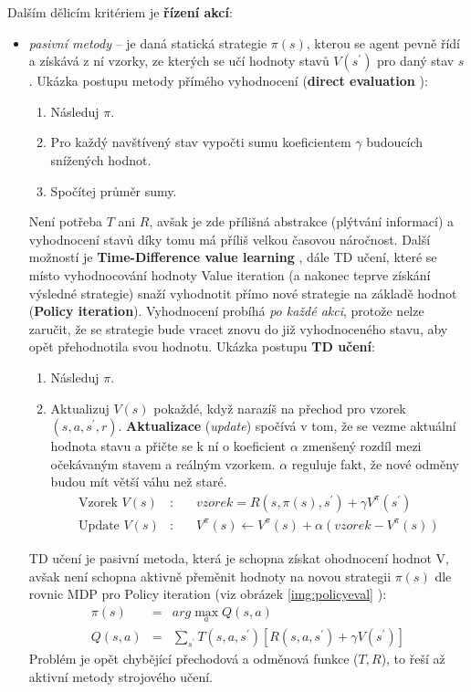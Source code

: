 Dalším dělicím kritériem je \textbf{řízení akcí}:
\begin{itemize}
  \item \textit{pasivní metody} -- je daná statická strategie $\pi(s)$, kterou se agent pevně řídí a získává z ní vzorky, ze kterých se učí hodnoty stavů $V(s^\prime)$ pro daný stav $s$.
  \newline
  Ukázka postupu metody přímého vyhodnocení (\textbf{direct evaluation} \cite{berkeley}):
  \begin{enumerate}
    \item Následuj $\pi$.
    \item Pro každý navštívený stav vypočti sumu koeficientem $\gamma$ budoucích snížených hodnot.
    \item Spočítej průměr sumy.
  \end{enumerate}
  Není potřeba $T$ ani $R$, avšak je zde přílišná abstrakce (plýtvání informací) a vyhodnocení stavů díky tomu má příliš velkou časovou náročnost.
  \newline
  Další možností je \textbf{Time-Difference value learning} \cite{RLIntro}, dále TD učení, které se místo vyhodnocování hodnoty Value iteration (a nakonec teprve získání výsledné strategie) snaží vyhodnotit přímo nové strategie na základě hodnot (\textbf{Policy iteration}). Vyhodnocení probíhá \textit{po každé akci}, protože nelze zaručit, že se strategie bude vracet znovu do již vyhodnoceného stavu, aby opět přehodnotila svou hodnotu.
  \newline
  Ukázka postupu \textbf{TD učení}:
  \begin{enumerate}
    \item Následuj $\pi$.
    \item Aktualizuj $V(s)$ pokaždé, když narazíš na přechod pro vzorek $(s,a,s^\prime,r)$. \textbf{Aktualizace} (\textit{update}) spočívá v tom, že se vezme aktuální hodnota stavu a přičte se k ní o koeficient $\alpha$ zmenšený rozdíl mezi očekávaným stavem a reálným vzorkem. $\alpha$ reguluje fakt, že nové odměny budou mít větší váhu než staré.
    \begin{eqnarray}
    \textrm{Vzorek $V(s)$} &\textrm{:}& \quad vzorek = R(s,\pi(s),s^\prime)+\gamma V^\pi(s^\prime) \\
    \textrm{Update $V(s)$} &\textrm{:}& \quad V^\pi(s) \leftarrow  V^\pi(s) + \alpha(vzorek - V^\pi(s))
    \end{eqnarray}
  \end{enumerate}
  TD učení je pasivní metoda, která je schopna získat ohodnocení hodnot V, avšak není schopna aktivně přeměnit hodnoty na novou strategii $\pi(s)$ dle rovnic MDP pro Policy iteration (viz obrázek \ref{img:policyeval} \cite{berkeley}):
  \begin{eqnarray}
  \pi(s) &=& arg \max_a Q(s,a) \\
  Q(s,a) &=& \sum_{s^\prime}T(s,a,s^\prime) \left[R(s,a,s^\prime)+\gamma V(s^\prime) \right]
  \end{eqnarray}
  Problém je opět chybějící přechodová a odměnová funkce ($T,R$), to řeší až aktivní metody strojového učení.


\end{itemize}
